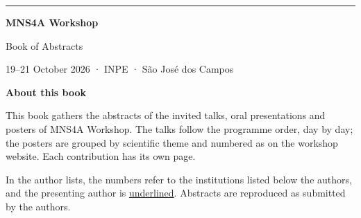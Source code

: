\documentclass[11pt,a4paper]{article}
\newcommand{\Presenter}[1]{\underline{#1}}
\begin{document}
\sloppy

\thispagestyle{empty}
\begin{titlepage}
\vspace*{3.2cm}
{\color{accent}\rule{3.2cm}{3pt}}\par\vspace{1.0cm}
{\raggedright\sffamily\bfseries\fontsize{40}{44}\selectfont\color{navy} MNS4A Workshop\par}
\vspace{0.6cm}
{\raggedright\sffamily\fontsize{24}{28}\selectfont\color{accent} Book of Abstracts\par}
\vfill
{\raggedright\sffamily\large\color{muted} 19–21 October 2026 · INPE · São José dos Campos\par}
\vspace{1.2cm}
\end{titlepage}

\clearpage
\thispagestyle{plain}
{\sffamily\bfseries\Huge\color{navy} About this book\par}
\vspace{14pt}
\noindent This book gathers the abstracts of the invited talks, oral presentations and
posters of MNS4A Workshop. The talks follow the programme order, day by day; the posters are grouped by
scientific theme and numbered as on the workshop website. Each contribution has its own page.

\medskip\noindent In the author lists, the numbers refer to the institutions listed below the authors, and the
presenting author is \Presenter{underlined}. Abstracts are reproduced as submitted by the authors.

\clearpage
\tableofcontents
\clearpage
{}
\end{document}
